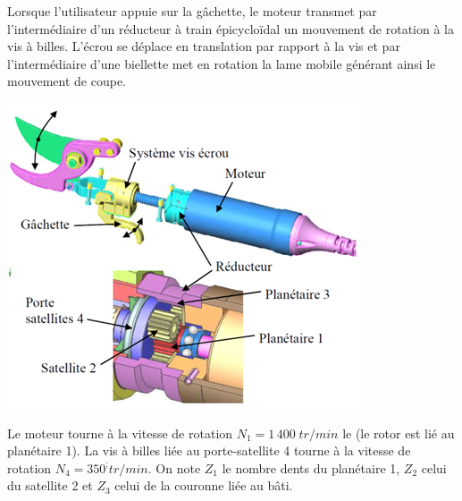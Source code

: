 \documentclass[10pt,oneside]{article}
\begin{document}
\begin{minipage}[c]{.55\linewidth}
Lorsque l’utilisateur appuie sur la gâchette, le moteur transmet par l’intermédiaire d’un réducteur à train épicycloïdal un mouvement de rotation à la vis à billes. L’écrou se déplace en translation par rapport à la vis et par l’intermédiaire d’une biellette met en rotation la lame mobile générant ainsi le mouvement de coupe. 
\end{minipage} \hfill
\begin{minipage}[c]{.4\linewidth}
\begin{center}
 \includegraphics[width=.95\textwidth]{png/secateur2}
\end{center}
\end{minipage} 


\vspace{.25cm}

Le moteur tourne à la vitesse de rotation $N_1=1\,400\;tr/min$ le (le rotor est lié au planétaire 1). La vis à billes liée au porte-satellite 4 tourne à la vitesse de rotation $N_4=350^; tr/min$. On note $Z_1$ le nombre dents du planétaire 1, $Z_2$ celui du satellite 2 et $Z_3$ celui de la couronne liée au bâti.

\vspace{.25cm}
\end{document}
